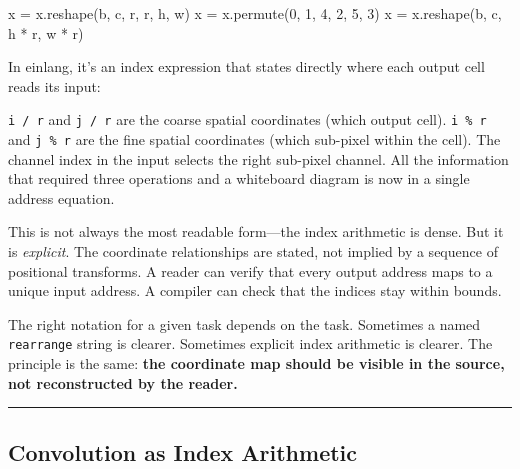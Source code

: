 \documentclass[11pt,]{article}
\newenvironment{Shaded}{}{}
\newcommand{\DecValTok}[1]{\textcolor[rgb]{0.25,0.63,0.44}{#1}}
\newcommand{\KeywordTok}[1]{\textcolor[rgb]{0.00,0.44,0.13}{\textbf{#1}}}
\newcommand{\NormalTok}[1]{#1}
\newcommand{\OperatorTok}[1]{\textcolor[rgb]{0.40,0.40,0.40}{#1}}
\begin{document}
\begin{Shaded}
\begin{Highlighting}[]
\NormalTok{x }\OperatorTok{=}\NormalTok{ x.reshape(b, c, r, r, h, w)}
\NormalTok{x }\OperatorTok{=}\NormalTok{ x.permute(}\DecValTok{0}\NormalTok{, }\DecValTok{1}\NormalTok{, }\DecValTok{4}\NormalTok{, }\DecValTok{2}\NormalTok{, }\DecValTok{5}\NormalTok{, }\DecValTok{3}\NormalTok{)}
\NormalTok{x }\OperatorTok{=}\NormalTok{ x.reshape(b, c, h }\OperatorTok{*}\NormalTok{ r, w }\OperatorTok{*}\NormalTok{ r)}
\end{Highlighting}
\end{Shaded}

In einlang, it's an index expression that states directly where each
output cell reads its input:

\begin{Shaded}
\end{Shaded}

\texttt{i\ /\ r} and \texttt{j\ /\ r} are the coarse spatial coordinates
(which output cell). \texttt{i\ \%\ r} and \texttt{j\ \%\ r} are the
fine spatial coordinates (which sub-pixel within the cell). The channel
index in the input selects the right sub-pixel channel. All the
information that required three operations and a whiteboard diagram is
now in a single address equation.

This is not always the most readable form---the index arithmetic is
dense. But it is \emph{explicit}. The coordinate relationships are
stated, not implied by a sequence of positional transforms. A reader can
verify that every output address maps to a unique input address. A
compiler can check that the indices stay within bounds.

The right notation for a given task depends on the task. Sometimes a
named \texttt{rearrange} string is clearer. Sometimes explicit index
arithmetic is clearer. The principle is the same: \textbf{the coordinate
map should be visible in the source, not reconstructed by the reader.}

\begin{center}\rule{0.5\linewidth}{0.4pt}\end{center}

\hypertarget{convolution-as-index-arithmetic}{%
\subsection{Convolution as Index
Arithmetic}\label{convolution-as-index-arithmetic}}
\end{document}
